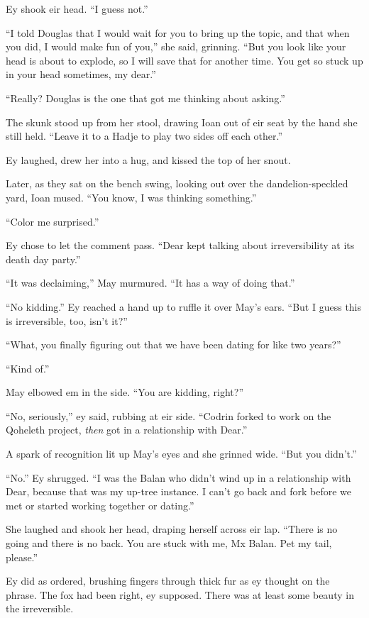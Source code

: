 Ey shook eir head. ``I guess not.''

``I told Douglas that I would wait for you to bring up the topic, and that when you did, I would make fun of you,'' she said, grinning. ``But you look like your head is about to explode, so I will save that for another time. You get so stuck up in your head sometimes, my dear.''

``Really? Douglas is the one that got me thinking about asking.''

The skunk stood up from her stool, drawing Ioan out of eir seat by the hand she still held. ``Leave it to a Hadje to play two sides off each other.''

Ey laughed, drew her into a hug, and kissed the top of her snout.

Later, as they sat on the bench swing, looking out over the dandelion-speckled yard, Ioan mused. ``You know, I was thinking something.''

``Color me surprised.''

Ey chose to let the comment pass. ``Dear kept talking about irreversibility at its death day party.''

``It was declaiming,'' May murmured. ``It has a way of doing that.''

``No kidding.'' Ey reached a hand up to ruffle it over May's ears. ``But I guess this is irreversible, too, isn't it?''

``What, you finally figuring out that we have been dating for like two years?''

``Kind of.''

May elbowed em in the side. ``You are kidding, right?''

``No, seriously,'' ey said, rubbing at eir side. ``Codrin forked to work on the Qoheleth project, \emph{then} got in a relationship with Dear.''

A spark of recognition lit up May's eyes and she grinned wide. ``But you didn't.''

``No.'' Ey shrugged. ``I was the Balan who didn't wind up in a relationship with Dear, because that was my up-tree instance. I can't go back and fork before we met or started working together or dating.''

She laughed and shook her head, draping herself across eir lap. ``There is no going and there is no back. You are stuck with me, Mx Balan. Pet my tail, please.''

Ey did as ordered, brushing fingers through thick fur as ey thought on the phrase. The fox had been right, ey supposed. There was at least some beauty in the irreversible.

